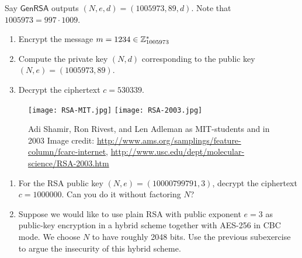 \documentclass[a4paper,10pt,landscape,twocolumn]{scrartcl}
\begin{document}
\begin{exercise}[RSA]
\begin{subex}
Say $\mathsf{GenRSA}$ outputs $(N,e,d)=(1005973,89,d)$. Note that $1005973=997 \cdot 1009$.
\begin{enumerate}
\item Encrypt the message $m=1234 \in \mathbb{Z}_{1005973}^*$
\item Compute the private key $(N,d)$ corresponding to the public key $(N,e)=(1005973,89)$.
\item Decrypt the ciphertext $c=530339$.
\end{enumerate}
\end{subex}


{
  \centering
  \begin{figure}
\texttt{[image: RSA-MIT.jpg]}
\texttt{[image: RSA-2003.jpg]}
\caption{Adi Shamir, Ron Rivest, and Len Adleman as MIT-students and in 2003\newline
{\small Image credit:
  \url{http://www.ams.org/samplings/feature-column/fcarc-internet},
  \url{http://www.usc.edu/dept/molecular-science/RSA-2003.htm}}}
\end{figure}
}

\begin{subex}
\begin{enumerate}
\item For the RSA public key $(N,e)=(10000799791, 3)$, decrypt the ciphertext $c=1 000 000$. Can you do it without factoring $N$?
\item Suppose we would like to use plain RSA with public exponent $e=3$ as public-key encryption in a hybrid scheme together with AES-256 in CBC mode. We choose $N$ to have roughly 2048 bits. Use the previous subexercise to argue the insecurity of this hybrid scheme.
\end{enumerate}
\end{subex}
\end{exercise}
\end{document}
